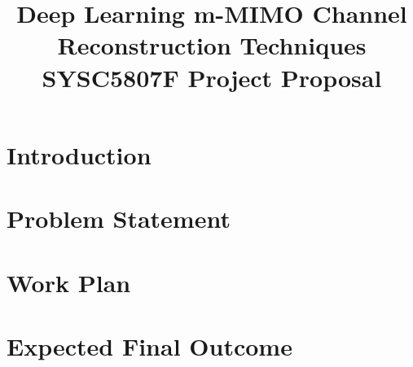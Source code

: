 \documentclass[conference, onecolumn]{IEEEtran}
\begin{document}
\title{Deep Learning m-MIMO Channel Reconstruction Techniques \\{\large {SYSC5807F Project Proposal}}}

\author{
    }

\maketitle

\begin{abstract}

\end{abstract}

\section{Introduction}
\label{sec:intro}


\section{Problem Statement}
\label{sec:problem_statement}


\section{Work Plan}
\label{sec:work_plan}



\section{Expected Final Outcome}
\label{sec:expected_outcome}





\end{document}
